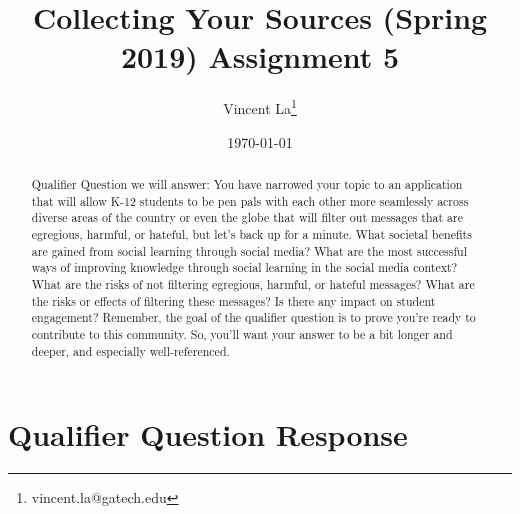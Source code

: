 \documentclass[12pt, final]{article}
\renewcommand{\thefootnote}{$\star$}
\begin{document}
\title{Collecting Your Sources (Spring 2019) Assignment 5}

\date{\today}

\renewcommand{\thefootnote}{$\dag$}
\author{Vincent La\footnote{vincent.la@gatech.edu}}

\maketitle

\begin{abstract}
Qualifier Question we will answer: You have narrowed your topic to an application that will allow K-12 students to be pen pals with each other more seamlessly across diverse areas of the country or even the globe that will filter out messages that are egregious, harmful, or hateful, but let's back up for a minute.  What societal benefits are gained from social learning through social media? What are the most successful ways of improving knowledge through social learning in the social media context? What are the risks of not filtering egregious, harmful, or hateful messages? What are the risks or effects of filtering these messages? Is there any impact on student engagement? Remember, the goal of the qualifier question is to prove you're ready to contribute to this community. So, you'll want your answer to be a bit longer and deeper, and especially well-referenced.
\end{abstract} 

\newpage
\renewcommand{\thefootnote}{\number\value{footnote}} 

\section{Qualifier Question Response}
\end{document}
